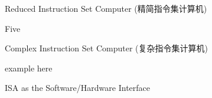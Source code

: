 
\begin{frame}{}
\end{frame}

\begin{frame}{}
  \begin{center}
     Reduced Instruction Set Computer (精简指令集计算机)

    \vspace{0.80cm}
    \vspace{0.80cm}

     Five
  \end{center}
\end{frame}

\begin{frame}{}
  \begin{center}
     Complex Instruction Set Computer (复杂指令集计算机)

    \vspace{0.30cm}
    \vspace{0.30cm}

  \end{center}
\end{frame}

\begin{frame}{}
  example here

  \begin{center}

    \vspace{0.30cm}
    \vspace{0.30cm}

  \end{center}
\end{frame}

\begin{frame}{}
  \begin{center}
    ISA as the Software/Hardware Interface
  \end{center}
\end{frame}

